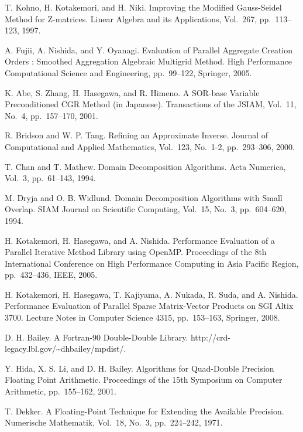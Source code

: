 \documentclass[a4paper]{jarticle}
\begin{document}
{{\begin{thebibliography}{10}
T. Kohno, H. Kotakemori, and H. Niki.
\newblock Improving the Modified Gauss-Seidel Method for Z-matrices.
\newblock Linear Algebra and its Applications, Vol.~267, pp.\ 113--123, 1997.

A. Fujii, A. Nishida, and Y. Oyanagi.
\newblock Evaluation of Parallel Aggregate Creation Orders : Smoothed Aggregation Algebraic Multigrid Method.
\newblock High Performance Computational Science and Engineering, pp.\ 99--122, Springer, 2005. 

K. Abe, S. Zhang, H. Hasegawa, and R. Himeno.
\newblock A SOR-base Variable Preconditioned CGR Method (in Japanese).
\newblock Transactions of the JSIAM,  Vol.~11, No.~4, pp.\ 157--170, 2001.

R. Bridson and W. P. Tang.
\newblock Refining an Approximate Inverse.
\newblock Journal of Computational and Applied Mathematics, Vol.~123, No.~1-2, pp.\ 293--306, 2000. 

T. Chan and T. Mathew.
\newblock Domain Decomposition Algorithms.
\newblock Acta Numerica, Vol.~3, pp.\ 61--143, 1994. 

M. Dryja and O. B. Widlund.
\newblock Domain Decomposition Algorithms with Small Overlap.
\newblock SIAM Journal on Scientific Computing, Vol.~15, No.~3, pp.\ 604--620, 1994.

H. Kotakemori, H. Hasegawa, and A. Nishida.
\newblock Performance Evaluation of a Parallel Iterative Method Library using OpenMP.
\newblock Proceedings of the 8th International Conference on High
	Performance Computing in Asia Pacific Region, pp.\ 432--436, IEEE, 2005.

H. Kotakemori, H. Hasegawa, T. Kajiyama, A. Nukada, R. Suda, and A. Nishida.
\newblock Performance Evaluation of Parallel Sparse Matrix-Vector Products on SGI Altix 3700.
\newblock Lecture Notes in Computer Science 4315, pp.\ 153--163, Springer, 2008.

D. H. Bailey.
\newblock A Fortran-90 Double-Double Library.
\newblock http://crd-legacy.lbl.gov/\textasciitilde dhbailey/mpdist/.

Y. Hida, X. S. Li, and D. H. Bailey.
\newblock Algorithms for Quad-Double Precision Floating Point Arithmetic.
\newblock Proceedings of the 15th Symposium on Computer Arithmetic, pp.\ 155--162, 2001.

T. Dekker.
\newblock A Floating-Point Technique for Extending the Available Precision.
\newblock Numerische Mathematik, Vol.~18, No.~3, pp.\ 224--242, 1971.


\end{thebibliography}}}
\end{document}
